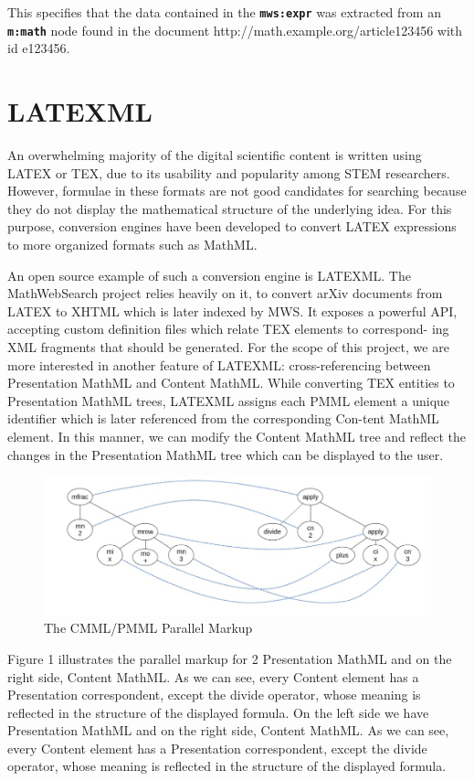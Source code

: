 \documentclass{deliverablereport}
\begin{document}
This specifies that the data contained in the \textbf{\texttt{mws:expr}} was extracted from an \textbf{\texttt{m:math}} node found in the document http://math.example.org/article123456 with id e123456.

\section{LATEXML}\label{sec:ml}
An overwhelming majority of the digital scientific content is written using LATEX or TEX,
due to its usability and popularity among STEM researchers. However, formulae in these
formats are not good candidates for searching because they do not display the mathematical
structure of the underlying idea. For this purpose, conversion engines have been developed
to convert LATEX expressions to more organized formats such as MathML. ~\cite{Ham:bcs15}

An open source example of such a conversion engine is LATEXML. The MathWebSearch project
relies heavily on it, to convert arXiv documents from LATEX to XHTML which is later
indexed by MWS. It exposes a powerful API, accepting custom definition files which relate
TEX elements to correspond- ing XML fragments that should be generated. For the scope of
this project, we are more interested in another feature of LATEXML: cross-referencing
between Presentation MathML and Content MathML. While converting TEX entities to
Presentation MathML trees, LATEXML assigns each PMML element a unique identifier which is
later referenced from the corresponding Con-tent MathML element. In this manner, we can
modify the Content MathML tree and reflect the changes in the Presentation MathML tree
which can be displayed to the user.
 

\begin{figure}[h]
\centering
 \includegraphics[scale=0.8]{figure2.jpg}
 \caption{The CMML/PMML Parallel Markup}
\end{figure}

Figure 1 illustrates the parallel markup for 2 Presentation MathML and on the right side,
Content MathML. As we can see, every Content element has a Presentation correspondent,
except the divide operator, whose meaning is reflected in the structure of the displayed
formula. On the left side we have Presentation MathML and on the right side, Content
MathML. As we can see, every Content element has a Presentation correspondent, except the
divide operator, whose meaning is reflected in the structure of the displayed formula.
\end{document}
